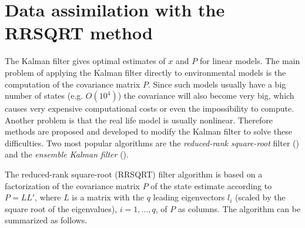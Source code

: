 \section{Data assimilation  with the RRSQRT method}

The Kalman filter gives optimal estimates of $x$ and $P$ for linear models. The
main problem of applying the Kalman filter directly to environmental models is
the computation of the covariance matrix $P$. Since such models usually have a
big number of states (e.g. $O(10^4)$) the covariance will also become very big,
which causes very expensive computational costs or even the impossibility to
compute. Another problem is that the real life model is usually nonlinear.
Therefore methods are proposed and developed to modify the Kalman filter to
solve these difficulties. Two most popular algorithms are the
\emph{reduced-rank square-root} filter (\cite{VerlaanHeemink1997}) and
the \emph{ensemble Kalman filter} (\cite{Evensen1994}).

The reduced-rank square-root (RRSQRT) filter algorithm is based on a
factorization of the covariance matrix $P$ of the state estimate according to
$P=LL'$, where $L$ is a matrix with the $q$ leading eigenvectors $l_i$ (scaled
by the square root of the eigenvalues), $i=1,...,q$, of $P$ as columns. The
algorithm can be summarized as follows.

